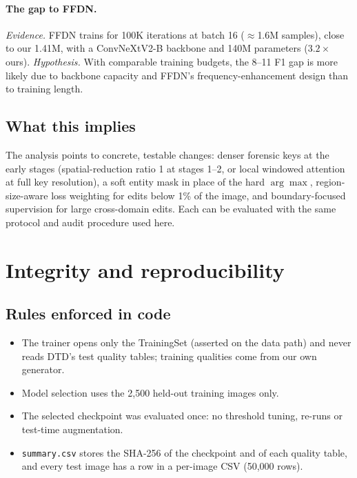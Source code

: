 \documentclass[11pt,a4paper]{article}
\begin{document}
\paragraph{The gap to FFDN.}
\emph{Evidence.} FFDN trains for 100K iterations at batch 16 ($\approx$1.6M samples), close to our
1.41M, with a ConvNeXtV2-B backbone and 140M parameters ($3.2\times$ ours).
\emph{Hypothesis.} With comparable training budgets, the 8--11 F1 gap is more likely due to
backbone capacity and FFDN's frequency-enhancement design than to training length.

\subsection{What this implies}
The analysis points to concrete, testable changes: denser forensic keys at the early stages
(spatial-reduction ratio 1 at stages 1--2, or local windowed attention at full key resolution),
a soft entity mask in place of the hard $\arg\max$, region-size-aware loss weighting for edits
below 1\% of the image, and boundary-focused supervision for large cross-domain edits. Each
can be evaluated with the same protocol and audit procedure used here.

\section{Integrity and reproducibility}\label{sec:audit}

\subsection{Rules enforced in code}
\begin{itemize}
  \item The trainer opens only the TrainingSet (asserted on the data path) and never reads DTD's
        test quality tables; training qualities come from our own generator.
  \item Model selection uses the 2{,}500 held-out training images only.
  \item The selected checkpoint was evaluated once: no threshold tuning, re-runs or test-time
        augmentation.
  \item \texttt{summary.csv} stores the SHA-256 of the checkpoint and of each quality table, and
        every test image has a row in a per-image CSV (50{,}000 rows).
\end{itemize}
\end{document}
